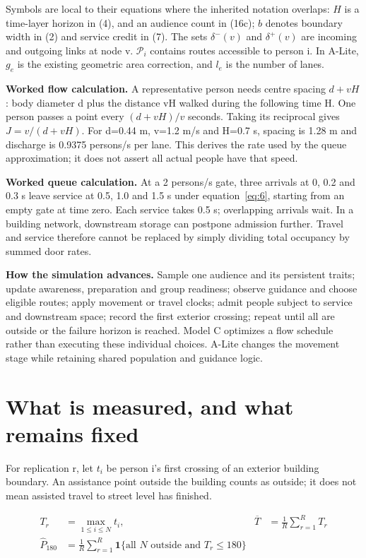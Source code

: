 \documentclass[11pt,a4paper]{article}
\begin{document}
Symbols are local to their equations where the inherited notation overlaps: $H$ is a time-layer horizon in (4), and an audience count in (16c); $b$ denotes boundary width in (2) and service credit in (7). The sets $\delta^-(v)$ and $\delta^+(v)$ are incoming and outgoing links at node v. $\mathcal P_i$ contains routes accessible to person i. In A-Lite, $g_e$ is the existing geometric area correction, and $l_e$ is the number of lanes.


\textbf{Worked flow calculation.} A representative person needs centre spacing $d+vH$: body diameter d plus the distance vH walked during the following time H. One person passes a point every $(d+vH)/v$ seconds. Taking its reciprocal gives $J=v/(d+vH)$. For d=0.44 m, v=1.2 m/s and H=0.7 s, spacing is 1.28 m and discharge is 0.9375 persons/s per lane. This derives the rate used by the queue approximation; it does not assert all actual people have that speed.


\textbf{Worked queue calculation.} At a 2 persons/s gate, three arrivals at 0, 0.2 and 0.3 s leave service at 0.5, 1.0 and 1.5 s under equation~\eqref{eq:6}, starting from an empty gate at time zero. Each service takes 0.5 s; overlapping arrivals wait. In a building network, downstream storage can postpone admission further. Travel and service therefore cannot be replaced by simply dividing total occupancy by summed door rates.


\textbf{How the simulation advances.} Sample one audience and its persistent traits; update awareness, preparation and group readiness; observe guidance and choose eligible routes; apply movement or travel clocks; admit people subject to service and downstream space; record the first exterior crossing; repeat until all are outside or the failure horizon is reached. Model C optimizes a flow schedule rather than executing these individual choices. A-Lite changes the movement stage while retaining shared population and guidance logic.


\section{What is measured, and what remains fixed}\label{sec:1}

For replication r, let \ensuremath{t_{i}} be person i's first crossing of an exterior building boundary. An assistance point outside the building counts as outside; it does not mean assisted travel to street level has finished.


\begin{equation}
\begin{aligned}
T_r &= \max_{1\le i\le N} t_i, & \overline T &= \frac1R\sum_{r=1}^R T_r \\
\widehat P_{180} &= \frac1R\sum_{r=1}^R \mathbf1\{\text{all }N\text{ outside and }T_r\le180\}
\end{aligned}
\tag{1}\label{eq:1}
\end{equation}
\end{document}
